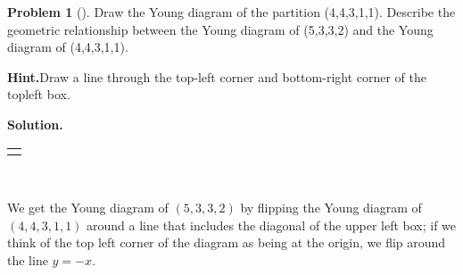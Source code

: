 \documentclass[10pt,]{book}
\theoremstyle{plain}
\theoremstyle{definition}
\newtheorem{activity}[project]{Problem}
\theoremstyle{definition}
\numberwithin{equation}{chapter}
\newlength{\panelmax}
\begin{document}
\begin{activity}[]\label{activity-163}
Draw the Young diagram of the partition (4,4,3,1,1). Describe the geometric relationship between the Young diagram of (5,3,3,2) and the Young diagram of (4,4,3,1,1).%
\par\medskip\noindent%
\textbf{Hint.}\quad Draw a line through the top-left corner and bottom-right corner of the topleft box.%
\par\medskip\noindent%
\textbf{Solution.}\quad %
{%
\setlength{\panelmax}{0pt}
\newsavebox{\panelboxWimage}
\newlength{\phWimage}\setlength{\phWimage}{\ht\panelboxWimage+\dp\panelboxWimage}
\settototalheight{\phWimage}{\usebox{\panelboxWimage}}
\setlength{\panelmax}{\maxof{\panelmax}{\phWimage}}
\leavevmode%
\setlength{\tabcolsep}{0\linewidth}
\par\medskip\noindent
\hspace*{0.41\linewidth}%
\begin{tabular}{@{}*{1}{c}@{}}
\begin{minipage}[c][\panelmax][t]{0.18\linewidth}\usebox{\panelboxWimage}\end{minipage}\end{tabular}\\
}%
\par
We get the Young diagram of \((5,3,3,2)\) by flipping the Young diagram of \((4,4,3,1,1)\) around a line that includes the diagonal of the upper left box; if we think of the top left corner of the diagram as being at the origin, we flip around the line \(y=-x\).%
\end{activity}
\end{document}

